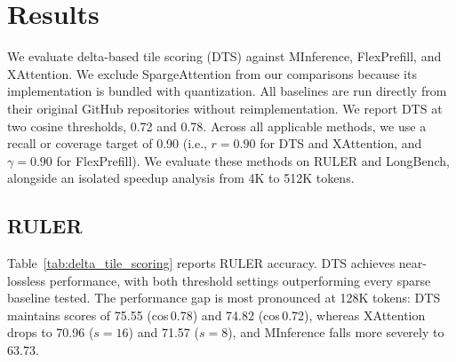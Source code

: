 \section{Results}

We evaluate delta-based tile scoring (DTS) against MInference, FlexPrefill, and XAttention. We exclude SpargeAttention from our comparisons because its implementation is bundled with quantization. All baselines are run directly from their original GitHub repositories without reimplementation. We report DTS at two cosine thresholds, 0.72 and 0.78. Across all applicable methods, we use a recall or coverage target of 0.90 (i.e., $r{=}0.90$ for DTS and XAttention, and $\gamma{=}0.90$ for FlexPrefill). We evaluate these methods on RULER and LongBench, alongside an isolated speedup analysis from 4K to 512K tokens.


\subsection{RULER}

Table~\ref{tab:delta_tile_scoring} reports RULER accuracy. DTS achieves near-lossless performance, with both threshold settings outperforming every sparse baseline tested. The performance gap is most pronounced at 128K tokens: DTS maintains scores of 75.55 (cos\,0.78) and 74.82 (cos\,0.72), whereas XAttention drops to 70.96 ($s{=}16$) and 71.57 ($s{=}8$), and MInference falls more severely to 63.73.

\begin{table}[!ht]
\centering
\caption{RULER accuracy (\%) comparing delta-based tile scoring against baseline and block-sparse methods on LLaMA-3.1 8B Instruct. Best score per column in \textbf{bold}.}
\label{tab:delta_tile_scoring}
\end{table}

